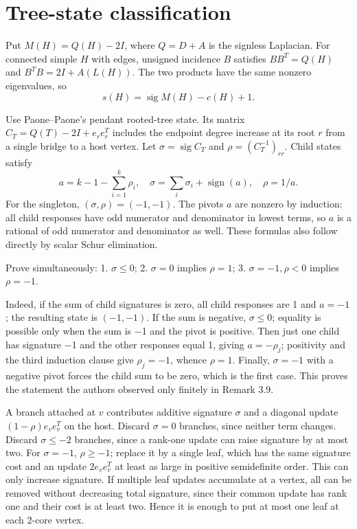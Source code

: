 \documentclass[11pt]{article}
\begin{document}
\section{Tree-state classification}\label{tree-state-classification}

Put \(M(H)=Q(H)-2I\), where \(Q=D+A\) is the signless Laplacian. For connected simple \(H\) with edges, unsigned incidence \(B\) satisfies \(BB^T=Q(H)\) and \(B^TB=2I + A(L(H))\). The two products have the same nonzero eigenvalues, so
\[
s(H)=\operatorname{sig}M(H)-c(H)+1.
\]

Use Paone--Paone's pendant rooted-tree state. Its matrix \(C_T=Q(T)-2I+e_re_r^T\) includes the endpoint degree increase at its root \(r\) from a single bridge to a host vertex. Let \(\sigma =\operatorname{sig}C_T\) and \(\rho =(C_T^{-1})_{rr}\). Child states satisfy
\[
a=k-1-\sum_{i=1}^k \rho _i,\quad
 \sigma =\sum_i \sigma _i+\operatorname{sign}(a),\quad \rho =1/a.
\]
For the singleton, \((\sigma ,\rho )=(-1,-1)\). The pivots \(a\) are nonzero by induction: all child responses have odd numerator and denominator in lowest terms, so \(a\) is a rational of odd numerator and denominator as well. These formulas also follow directly by scalar Schur elimination.

Prove simultaneously:
1. \(\sigma \le 0\);
2. \(\sigma =0\) implies \(\rho =1\);
3. \(\sigma =-1,\rho <0\) implies \(\rho =-1\).

Indeed, if the sum of child signatures is zero, all child responses are 1 and \(a=-1\); the resulting state is \((-1,-1)\). If the sum is negative, \(\sigma \le 0\); equality is possible only when the sum is −1 and the pivot is positive. Then just one child has signature −1 and the other responses equal 1, giving \(a=-\rho _j\); positivity and the third induction clause give \(\rho _j=-1\), whence \(\rho =1\). Finally, \(\sigma =-1\) with a negative pivot forces the child sum to be zero, which is the first case. This proves the statement the authors observed only finitely in Remark 3.9.

A branch attached at \(v\) contributes additive signature \(\sigma\) and a diagonal update \((1-\rho )e_ve_v^T\) on the host. Discard \(\sigma =0\) branches, since neither term changes. Discard \(\sigma \le -2\) branches, since a rank-one update can raise signature by at most two. For \(\sigma =-1\), \(\rho \ge -1\); replace it by a single leaf, which has the same signature cost and an update \(2e_ve_v^T\) at least as large in positive semidefinite order. This can only increase signature. If multiple leaf updates accumulate at a vertex, all can be removed without decreasing total signature, since their common update has rank one and their cost is at least two. Hence it is enough to put at most one leaf at each 2-core vertex.
\end{document}
